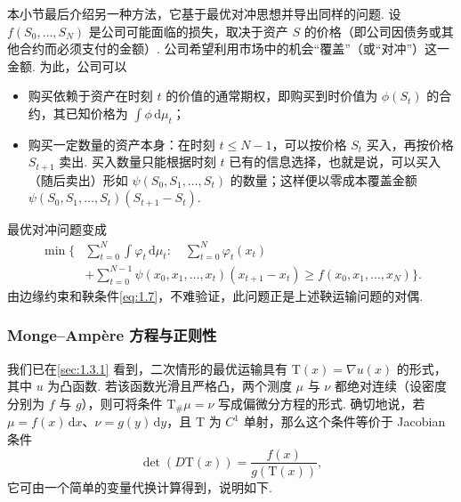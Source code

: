 \label{idx:i147-p53}
本小节最后介绍另一种方法，它基于最优对冲思想并导出同样的问题. 设 $f(S_0,\allowbreak\ldots,\allowbreak S_N)$ 是公司可能面临的损失，取决于资产 $S$ 的价格（即公司因债务或其他合约而必须支付的金额）. 公司希望利用市场中的机会“覆盖”（或“对冲”）这一金额. 为此，公司可以
\begin{itemize}
 \item 购买依赖于资产在时刻 $t$ 的价值的通常期权，即购买到时价值为 $\phi(S_t)$ 的合约，其已知价格为 $\int\phi\,\mathrm d\mu_t$；
 \item 购买一定数量的资产本身：在时刻 $t\leq N-1$，可以按价格 $S_t$ 买入，再按价格 $S_{t+1}$ 卖出. 买入数量只能根据时刻 $t$ 已有的信息选择，也就是说，可以买入（随后卖出）形如 $\psi(S_0,S_1,\ldots,S_t)$ 的数量；这样便以零成本覆盖金额 $\psi(S_0,S_1,\ldots,S_t)(S_{t+1}-S_t)$.
\end{itemize}
最优对冲问题变成
\begin{equation*}
\begin{aligned}
 \min\biggl\{&\sum_{t=0}^N\int\varphi_t\,\mathrm d\mu_t:\quad
     \sum_{t=0}^N\varphi_t(x_t)\\
    &+\sum_{t=0}^{N-1}\psi(x_0,x_1,\ldots,x_t)(x_{t+1}-x_t)
         \geq f(x_0,x_1,\ldots,x_N)\biggr\}.
\end{aligned}
\end{equation*}
由边缘约束和鞅条件\eqref{eq:1.7}，不难验证，此问题正是上述鞅运输问题的对偶.

\subsubsection{Monge--Amp\`ere 方程与正则性}\label{sec:1.7.6}

我们已在\autoref{sec:1.3.1} 看到，二次情形的最优运输具有 $\mathrm{T}(x)=\nabla u(x)$ 的形式，其中 $u$ 为凸函数. 若该函数光滑且严格凸，两个测度 $\mu$ 与 $\nu$ 都绝对连续（设密度分别为 $f$ 与 $g$），则可将条件 $\mathrm{T}_\#\mu=\nu$ 写成偏微分方程的形式. 确切地说，若 $\mu=f(x)\,\mathrm dx$、$\nu=g(y)\,\mathrm dy$，且 $\mathrm{T}$ 为 $C^1$ 单射，那么这个条件等价于 Jacobian 条件
\[
 \det(D\mathrm{T}(x))=\frac{f(x)}{g(\mathrm{T}(x))},
\]
它可由一个简单的变量代换计算得到，说明如下.


